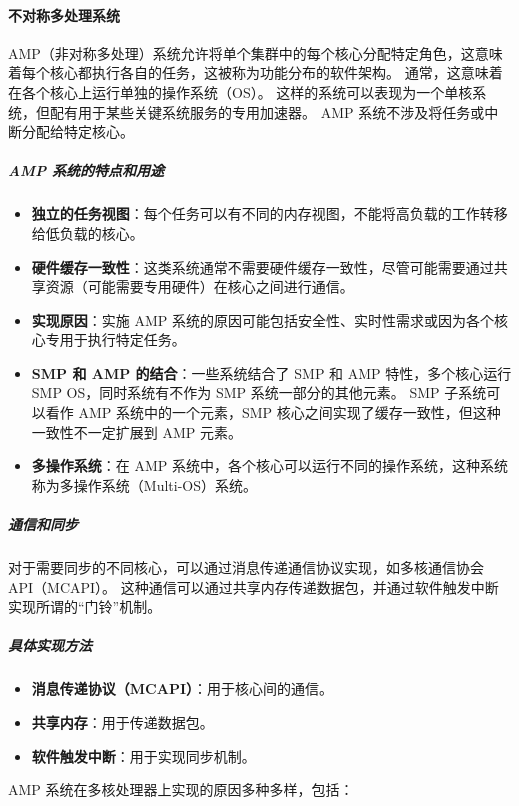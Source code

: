 \paragraph{不对称多处理系统}

AMP（非对称多处理）系统允许将单个集群中的每个核心分配特定角色，这意味着每个核心都执行各自的任务，这被称为功能分布的软件架构。
通常，这意味着在各个核心上运行单独的操作系统（OS）。
这样的系统可以表现为一个单核系统，但配有用于某些关键系统服务的专用加速器。
AMP 系统不涉及将任务或中断分配给特定核心。

\subparagraph*{AMP 系统的特点和用途}

\begin{itemize}

\item
  \textbf{独立的任务视图}：每个任务可以有不同的内存视图，不能将高负载的工作转移给低负载的核心。
\item
  \textbf{硬件缓存一致性}：这类系统通常不需要硬件缓存一致性，尽管可能需要通过共享资源（可能需要专用硬件）在核心之间进行通信。
\item
  \textbf{实现原因}：实施 AMP 系统的原因可能包括安全性、实时性需求或因为各个核心专用于执行特定任务。
\item
  \textbf{SMP 和 AMP 的结合}：一些系统结合了 SMP 和 AMP 特性，多个核心运行 SMP
  OS，同时系统有不作为 SMP 系统一部分的其他元素。
  SMP 子系统可以看作 AMP 系统中的一个元素，SMP 核心之间实现了缓存一致性，但这种一致性不一定扩展到 AMP 元素。
\item
  \textbf{多操作系统}：在 AMP 系统中，各个核心可以运行不同的操作系统，这种系统称为多操作系统（Multi-OS）系统。
\end{itemize}

\subparagraph*{通信和同步}

对于需要同步的不同核心，可以通过消息传递通信协议实现，如多核通信协会 API（MCAPI）。
这种通信可以通过共享内存传递数据包，并通过软件触发中断实现所谓的“门铃”机制。

\subparagraph*{具体实现方法}

\begin{itemize}

\item
  \textbf{消息传递协议（MCAPI）}：用于核心间的通信。
\item
  \textbf{共享内存}：用于传递数据包。
\item
  \textbf{软件触发中断}：用于实现同步机制。
\end{itemize}

AMP 系统在多核处理器上实现的原因多种多样，包括：

